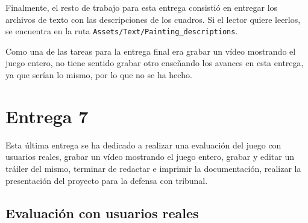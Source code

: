 Finalmente, el resto de trabajo para esta entrega consistió en entregar los archivos de texto con las descripciones de los cuadros. Si el lector quiere leerlos, se encuentra en la ruta \texttt{Assets/Text/Painting\_descriptions}.

Como una de las tareas para la entrega final era grabar un vídeo mostrando el juego entero, no tiene sentido grabar otro enseñando los avances en esta entrega, ya que serían lo mismo, por lo que no se ha hecho.

\section{Entrega 7}

Esta última entrega se ha dedicado a realizar una evaluación del juego con usuarios reales, grabar un vídeo mostrando el juego entero, grabar y editar un tráiler del mismo, terminar de redactar e imprimir la documentación, realizar la presentación del proyecto para la defensa con tribunal.

\subsection{Evaluación con usuarios reales}